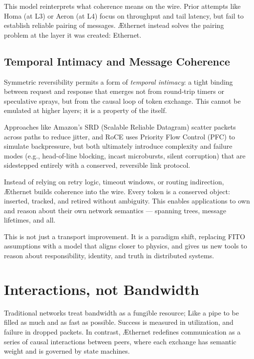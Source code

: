 \documentclass[../OAE-SPEC-MAIN.tex]{subfiles}
\begin{document}
This model reinterprets what coherence means on the wire. Prior attempts like Homa (at L3) or Aeron (at L4) focus on throughput and tail latency, but fail to establish reliable pairing of messages. \AE thernet instead solves the pairing problem at the layer it was created: Ethernet.



\subsection*{Temporal Intimacy and Message Coherence}

Symmetric reversibility permits a form of \emph{temporal intimacy}: a tight binding between request and response that emerges not from round-trip timers or speculative sprays, but from the causal loop of token exchange. This cannot be emulated at higher layers; it is a property of the \LINK itself.

Approaches like Amazon’s SRD (Scalable Reliable Datagram) scatter packets across paths to reduce jitter, and RoCE uses Priority Flow Control (PFC) to simulate backpressure, but both ultimately introduce complexity and failure modes (e.g., head-of-line blocking, incast microbursts, silent corruption) that are sidestepped entirely with a conserved, reversible link protocol.

Instead of relying on retry logic, timeout windows, or routing indirection, \AE thernet builds coherence into the wire. Every token is a conserved object: inserted, tracked, and retired without ambiguity. This enables applications to own and reason about their own network semantics — spanning trees, message lifetimes, and all.

This is not just a transport improvement. It is a paradigm shift, replacing FITO assumptions with a model that aligns closer to physics, and gives us new tools to reason about responsibility, identity, and truth in distributed systems.









\section{Interactions, not Bandwidth}

Traditional networks treat bandwidth as a fungible resource; Like a pipe to be filled as much and as fast as possible. Success is measured in utilization, and failure in dropped packets. In contrast, \AE thernet redefines communication as a series of causal interactions between peers, where each exchange has semantic weight and is governed by \LINK state machines.
\end{document}

